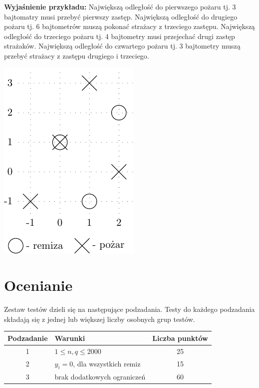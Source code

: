 \documentclass[10pt]{article}
\begin{document}
    \vspace{2ex}
    \noindent\textbf{Wyjaśnienie przykładu:} Największą odległość do pierwszego pożaru tj. 3 bajtomatry musi przebyć pierwszy zastęp. Największą odległość do drugiego pożaru tj. 6 bajtometrów muszą pokonać strażacy z trzeciego zastępu. Największą odległość do trzeciego pożaru tj. 4 bajtometry musi przejechać drugi zastęp strażaków. Największą odległość do czwartego pożaru tj. 3 bajtometry muszą przebyć strażacy z zastępu drugiego i trzeciego.
    \vspace{2ex}
    \begin{center}
        \includegraphics{osprys-1.pdf}
    \end{center}
    

    \section*{Ocenianie}
        
    Zestaw testów dzieli się na następujące podzadania. Testy do każdego podzadania składają się z jednej lub większej liczby osobnych grup testów.
    
    \begin{center}
        \begin{tabular}{ |c|p{9cm}|c| }
            \hline
            \textbf{Podzadanie} & \textbf{Warunki} & \textbf{Liczba punktów}\\
            \hline
            1 & $1 \leq n, q \leq 2000$ & 25\\
            \hline
            2 & $y_{i} = 0$, dla wszystkich remiz & 15\\
            \hline
            3 & brak dodatkowych ograniczeń & 60\\
            \hline
        \end{tabular}
    \end{center}
\end{document}
